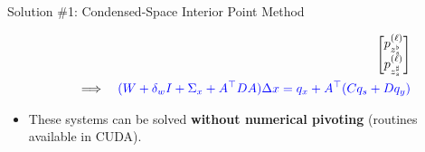 \begin{frame}{Solution \#1: Condensed-Space Interior Point Method}
\begin{itemize}
{\begin{align*}
\begin{bmatrix}
          p^{(\ell)}_{z_s^\flat }\\
          p^{(\ell)}_{z_s^\sharp }\\
        \end{bmatrix}\\
        \Longrightarrow\quad
        \color{blue}{(W + \delta_wI + \Sigma_x + A^{\top} D A ) \Delta x = q_x + A^\top (C q_s +  Dq_y )}
      \end{align*}
    }
    \vspace{-.2in}
  \item<4-> These systems can be solved {\bf without numerical pivoting} (routines available in CUDA).
  \end{itemize}
\end{frame}

